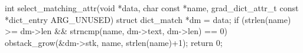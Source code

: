 int
select_matching_attr(void *data, char const *name,
		     grad_dict_attr_t const *dict_entry ARG_UNUSED)
{
	struct dict_match *dm = data;
	if (strlen(name) >= dm->len && strncmp(name, dm->text, dm->len) == 0) 
		obstack_grow(&dm->stk, name, strlen(name)+1);
	return 0;
}